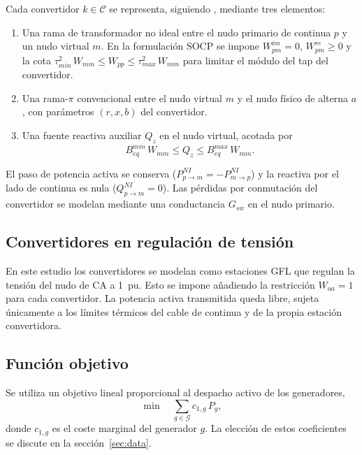 \documentclass[12pt,a4paper]{iit-project-draft-report}
\begin{document}
Cada convertidor $k \in \mathcal{C}$ se representa, siguiendo
\cite{HigueraGutierrez2025}, mediante tres elementos:
\begin{enumerate}
  \item Una rama de transformador no ideal entre el nudo primario de
  continua $p$ y un nudo virtual $m$. En la formulación \gls{SOCP} se
  impone $W^{im}_{pm}=0$, $W^{re}_{pm}\ge 0$ y la cota
  $\tau_{min}^{2}\,W_{mm} \le W_{pp} \le \tau_{max}^{2}\,W_{mm}$
  para limitar el módulo del tap del convertidor.
  \item Una rama-$\pi$ convencional entre el nudo virtual $m$ y el nudo
  físico de alterna $a$, con parámetros $(r,x,b)$ del convertidor.
  \item Una fuente reactiva auxiliar $Q_z$ en el nudo virtual, acotada por
  \begin{equation}
  B_{eq}^{min}\,W_{mm} \le Q_z \le B_{eq}^{max}\,W_{mm}.
  \label{eq:qz}
  \end{equation}
\end{enumerate}
El paso de potencia activa se conserva
($P^{NI}_{p \to m} = -P^{NI}_{m \to p}$) y la reactiva por el lado de
continua es nula ($Q^{NI}_{p \to m} = 0$). Las pérdidas por conmutación
del convertidor se modelan mediante una conductancia $G_{sw}$ en el nudo
primario.

\subsection{Convertidores en regulación de tensión}

En este estudio los convertidores se modelan como estaciones \gls{GFL}
que regulan la tensión del nudo de \gls{CA} a \SI{1}{pu}. Esto se impone
añadiendo la restricción $W_{aa} = 1$ para cada convertidor. La potencia
activa transmitida queda libre, sujeta únicamente a los límites térmicos
del cable de continua y de la propia estación convertidora.

\subsection{Función objetivo}

Se utiliza un objetivo lineal proporcional al despacho activo de los
generadores,
\begin{equation}
\min \quad \sum_{g \in \mathcal{G}} c_{1,g}\,P_g,
\label{eq:obj}
\end{equation}
donde $c_{1,g}$ es el coste marginal del generador $g$. La elección de
estos coeficientes se discute en la sección~\ref{sec:data}.
\end{document}
